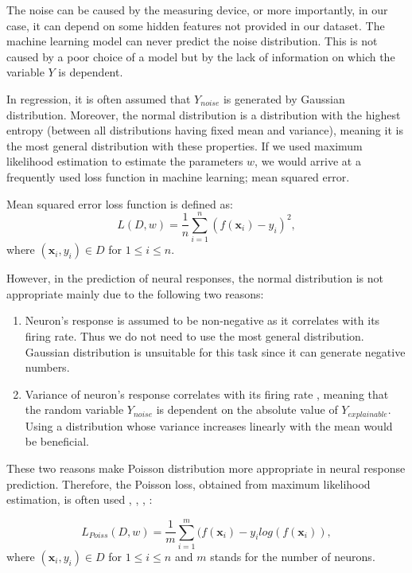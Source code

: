 The noise can be caused by the measuring device, or more importantly, in our case, it can depend on some hidden features not provided in our dataset. The machine learning model can never predict the noise distribution. This is not caused by a poor choice of a model but by the lack of information on which the variable $Y$ is dependent.

In regression, it is often assumed that $Y_{noise}$ is generated by Gaussian distribution. Moreover, the normal distribution is a distribution with the highest entropy (between all distributions having fixed mean and variance), meaning it is the most general distribution with these properties. If we used maximum likelihood estimation to estimate the parameters $w$, we would arrive at a frequently used loss function in machine learning; mean squared error.


\begin{defn}\label{def01:5}
	Mean squared error loss function is defined as:
	\begin{equation}
	L(D, w) = \frac{1}{n} \sum_{i=1}^n (f(\textbf{x}_i) - y_i)^2,
	\end{equation}
	where $(\textbf{x}_i, y_i) \in D$ for $1 \leq i \leq n$.
\end{defn}

However, in the prediction of neural responses, the normal distribution is not appropriate mainly due to the following two reasons:
\begin{enumerate}
	\item Neuron’s response is assumed to be non-negative as it correlates with its firing rate. Thus we do not need to use the most general distribution. Gaussian distribution is unsuitable for this task since it can generate negative numbers.
	\item Variance of neuron’s response correlates with its firing rate \citep{goris2014partitioning}, meaning that the random variable $Y_{noise}$ is dependent on the absolute value of $Y_{explainable}$. Using a distribution whose variance increases linearly with the mean would be beneficial.
\end{enumerate}


These two reasons make Poisson distribution more appropriate in neural response prediction. Therefore, the Poisson loss, obtained from maximum likelihood estimation, is often used \citep{cadena2019deep}, \citep{klindt2017neural}, \citep{sinz2018stimulus}, \citep{lurz2021generalization}:

\begin{defn}\label{def01:6}
	\begin{equation}
		L_{Poiss}(D, w) = \frac{1}{m} \sum_{i=1}^m (f(\textbf{x}_i) - y_i log(f(\textbf{x}_i)),
	\end{equation}
	where $(\textbf{x}_i, y_i) \in D$ for $1 \leq i \leq n$ and $m$ stands for the number of neurons.
\end{defn}


